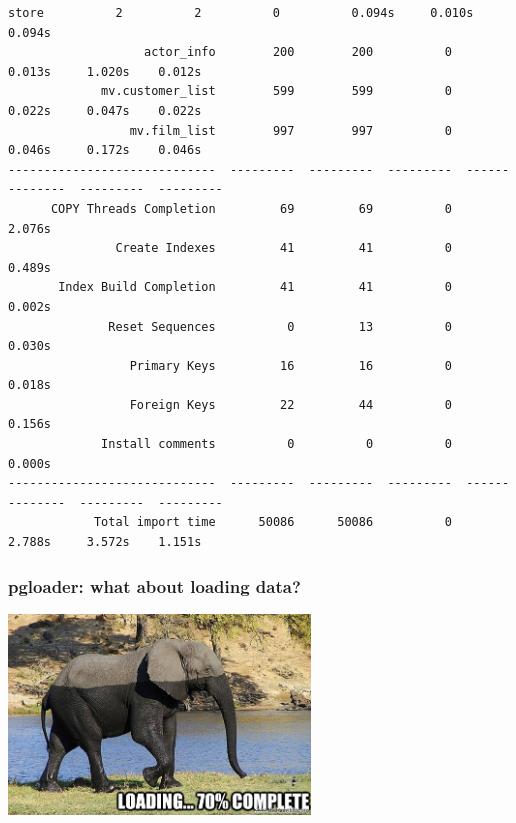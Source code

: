 \documentclass{beamer}
\begin{document}
\begin{frame}[fragile]
\begin{Verbatim}[fontsize=\tiny]
                        store          2          2          0          0.094s     0.010s    0.094s
                   actor_info        200        200          0          0.013s     1.020s    0.012s
             mv.customer_list        599        599          0          0.022s     0.047s    0.022s
                 mv.film_list        997        997          0          0.046s     0.172s    0.046s
-----------------------------  ---------  ---------  ---------  --------------  ---------  ---------
      COPY Threads Completion         69         69          0          2.076s                     
               Create Indexes         41         41          0          0.489s                     
       Index Build Completion         41         41          0          0.002s                     
              Reset Sequences          0         13          0          0.030s                     
                 Primary Keys         16         16          0          0.018s                     
                 Foreign Keys         22         44          0          0.156s                     
             Install comments          0          0          0          0.000s                     
-----------------------------  ---------  ---------  ---------  --------------  ---------  ---------
            Total import time      50086      50086          0          2.788s     3.572s    1.151s
\end{Verbatim}
\end{frame}

\begin{frame}
  \frametitle{pgloader: what about loading data?}


  \begin{center}
    \includegraphics[height=2.1in]{elephant-loading.jpg}
  \end{center}
\end{frame}
\end{document}
